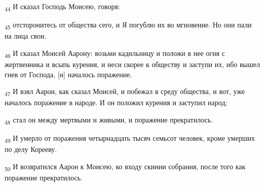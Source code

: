 \begin{tcolorbox}
\textsubscript{44} И сказал Господь Моисею, говоря:
\end{tcolorbox}
\begin{tcolorbox}
\textsubscript{45} отсторонитесь от общества сего, и Я погублю их во мгновение. Но они пали на лица свои.
\end{tcolorbox}
\begin{tcolorbox}
\textsubscript{46} И сказал Моисей Аарону: возьми кадильницу и положи в нее огня с жертвенника и всыпь курения, и неси скорее к обществу и заступи их, ибо вышел гнев от Господа, [и] началось поражение.
\end{tcolorbox}
\begin{tcolorbox}
\textsubscript{47} И взял Аарон, как сказал Моисей, и побежал в среду общества, и вот, уже началось поражение в народе. И он положил курения и заступил народ;
\end{tcolorbox}
\begin{tcolorbox}
\textsubscript{48} стал он между мертвыми и живыми, и поражение прекратилось.
\end{tcolorbox}
\begin{tcolorbox}
\textsubscript{49} И умерло от поражения четырнадцать тысяч семьсот человек, кроме умерших по делу Корееву.
\end{tcolorbox}
\begin{tcolorbox}
\textsubscript{50} И возвратился Аарон к Моисею, ко входу скинии собрания, после того как поражение прекратилось.
\end{tcolorbox}
